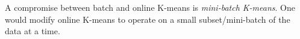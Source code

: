 \begin{frame}
A compromise between batch and online K-means is \emph{mini-batch K-means}.
One would modify online K-means to operate on a small subset/mini-batch of the data at a time.

\end{frame}

